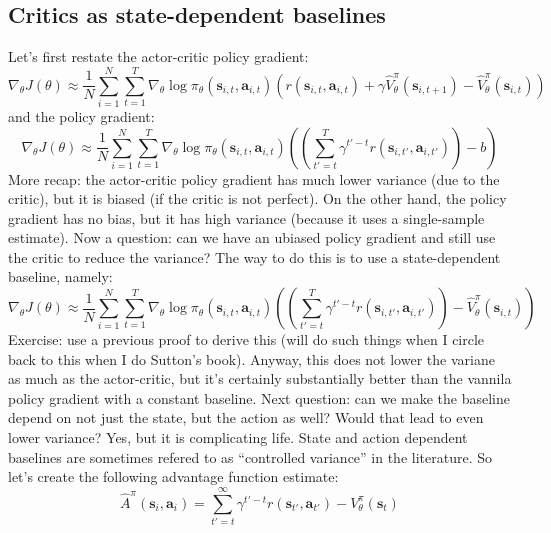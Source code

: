 \documentclass{report}
\begin{document}
\subsection{Critics as state-dependent baselines}
Let's first restate the actor-critic policy gradient:
\begin{equation}
	\nabla_\theta J(\theta) \approx \frac{1}{N} \sum_{i=1}^{N} \sum_{t=1}^{T} \nabla_{\theta} \log \pi_\theta(\bm{s}_{i,t}, \bm{a}_{i,t})
		\left( r(\bm{s}_{i,t}, \bm{a}_{i,t}) + \gamma \hat{V}^\pi_\theta(\bm{s}_{i,t+1}) - \hat{V}^\pi_\theta(\bm{s}_{i,t}) \right) 
\end{equation}
and the policy gradient:
\begin{equation}
		\nabla_\theta J(\theta) \approx \frac{1}{N} \sum_{i=1}^{N} \sum_{t=1}^{T} \nabla_{\theta} \log \pi_\theta(\bm{s}_{i,t}, \bm{a}_{i,t})
		\left( \left( \sum_{t'=t}^{T} \gamma^{t' -t} r(\bm{s}_{i,t'}, \bm{a}_{i,t'}) \right) -b \right) 
\end{equation}
More recap: the actor-critic policy gradient has much lower variance (due to the critic), but it is biased (if the critic is not perfect).
On the other hand, the policy gradient has no bias, but it has high variance (because it uses a single-sample estimate).
Now a question: can we have an ubiased policy gradient and still use the critic to reduce the variance?
The way to do this is to use a state-dependent baseline, namely:
\begin{equation}
		\nabla_\theta J(\theta) \approx \frac{1}{N} \sum_{i=1}^{N} \sum_{t=1}^{T} \nabla_{\theta} \log \pi_\theta(\bm{s}_{i,t}, \bm{a}_{i,t})
		\left( \left( \sum_{t'=t}^{T} \gamma^{t' -t} r(\bm{s}_{i,t'}, \bm{a}_{i,t'}) \right)  - \hat{V}^\pi_\theta(\bm{s}_{i,t}) \right) 
\end{equation}
Exercise: use a previous proof to derive this (will do such things when I circle back to this when I do Sutton's book).
Anyway, this does not lower the variane as much as the actor-critic, but it's certainly substantially better than the vannila policy gradient with a constant baseline.
Next question: can we make the baseline depend on not just the state, but the action as well? Would that lead to even lower variance?
Yes, but it is complicating life.
State and action dependent baselines are sometimes refered to as ``controlled variance'' in the literature.
So let's create the following advantage function estimate:
\begin{equation}
		\hat{A}^\pi (\bm{s}_{i}, \bm{a}_{i}) = \sum_{t'=t}^{\infty} \gamma^{t'-t} r(\bm{s}_{t'}, \bm{a}_{t'}) - V^\pi_\theta(\bm{s}_t)
\end{equation}
\end{document}
